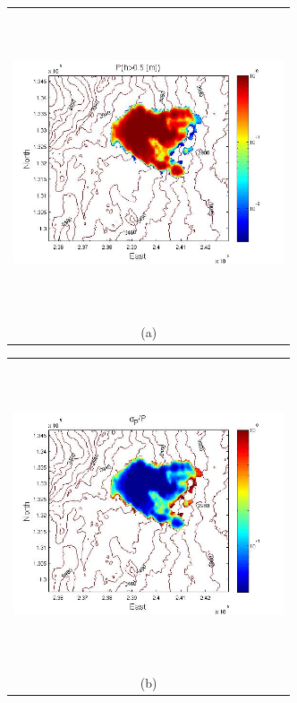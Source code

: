 \documentclass{article}
\newcommand{\Pic}[2][0.85]{\begin{center}\texttt{[image: \#2]}
 \end{center} }
\begin{document}
\begin{figure}[H]
    \begin{minipage}[b]{0.6\textwidth}
        \begin{tabular}{c}
       \includegraphics[width=8cm,height=9cm,keepaspectratio]{figs/Galeras_0_P_5m.jpg}\\
        (a)
        \end{tabular}
    \end{minipage}
    \begin{minipage}{0.6\textwidth}
        \begin{tabular}{c}
	\includegraphics[width=8cm,height=9cm,keepaspectratio]{figs/Galeras_0_sigma_5m.jpg}\\
        (b)

\end{tabular}
\end{minipage}
\end{figure}
\end{document}
